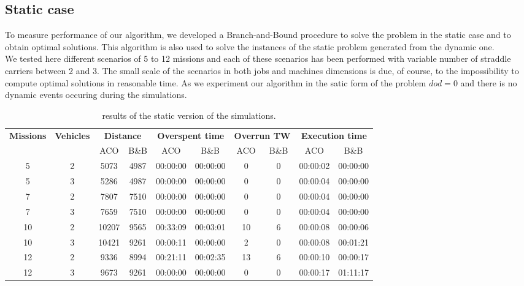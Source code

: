 \documentclass[a4paper,10pt]{article}
\begin{document}
	\subsection{Static case}
  To measure performance of our algorithm, we developed a Branch-and-Bound procedure to solve the problem in the static case and to obtain optimal solutions. This algorithm is also used to solve the instances of the static problem generated from the dynamic one.\\

  We tested here different scenarios of 5 to 12 missions and each of these scenarios has been performed with variable number of straddle carriers between 2 and 3. The small scale of the scenarios in both jobs and machines dimensions is due, of course, to the impossibility to compute optimal solutions in reasonable time.
  As we experiment our algorithm in the satic form of the problem $dod=0$ and there is no dynamic events occuring during the simulations.

  \small
\begin{table}[h]
  \begin{center}
    \begin{tabular}{|c|c|c|c|c|c|c|c|c|c|} 
    \hline
      \multirow{2}{*}{\bf{Missions}} & \multirow{2}{*}{\bf{Vehicles}} & \multicolumn{2}{|c|}{\bf{Distance}} & \multicolumn{2}{|c|}{\bf{Overspent time}} & \multicolumn{2}{|c|}{\bf{Overrun TW}} &  \multicolumn{2}{|c|}{\bf{Execution time}} \\\cline{3-10}
		 &	& ACO 	& B\&B	& ACO	& B\&B		& ACO		& B\&B	& ACO		& B\&B\\ \hline
	5	 & 2 	& 5073	& 4987	& 00:00:00	& 00:00:00 	& 0	& 0	& 00:00:02	& 00:00:00\\
	5	 & 3 	& 5286	& 4987	& 00:00:00	& 00:00:00	& 0	& 0	& 00:00:04	& 00:00:00\\
	7	 & 2	& 7807	& 7510	& 00:00:00	& 00:00:00	& 0	& 0	& 00:00:04	& 00:00:00\\
	7	 & 3	& 7659	& 7510	& 00:00:00	& 00:00:00	& 0	& 0	& 00:00:04	& 00:00:00\\
	10	 & 2	& 10207	& 9565	& 00:33:09	& 00:03:01	& 10	& 6	& 00:00:08	& 00:00:06\\
	10	 & 3	& 10421	& 9261	& 00:00:11	& 00:00:00	& 2	& 0	& 00:00:08	& 00:01:21\\
	12	 & 2	& 9336	& 8994	& 00:21:11	& 00:02:35	& 13	& 6	& 00:00:10	& 00:00:17\\
	12	 & 3	& 9673	& 9261	& 00:00:00	& 00:00:00	& 0	& 0	& 00:00:17	& 01:11:17\\
      \hline
    \end{tabular}
  \caption{results of the static version of the simulations.}
  \end{center}
\end{table}
  \normalsize
\end{document}
